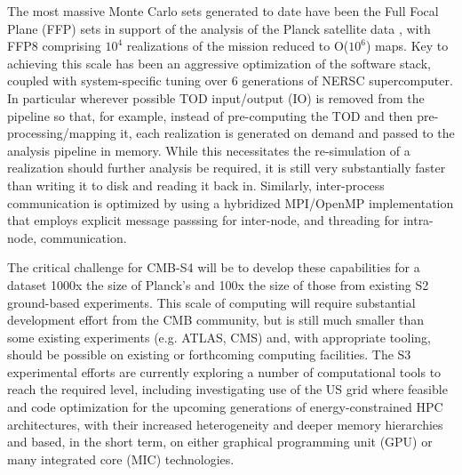 The most massive Monte Carlo sets generated to date have been the Full Focal Plane (FFP) sets in support of the analysis of the Planck satellite data \cite{Ade:2015via}, with FFP8 comprising $10^4$ realizations of the mission reduced to O($10^6$) maps. Key to achieving this scale has been an aggressive optimization of the software stack, coupled with system-specific tuning over 6 generations of NERSC supercomputer. In particular wherever possible TOD input/output (IO) is removed from the pipeline so that, for example, instead of pre-computing the TOD and then pre-processing/mapping it, each realization is generated on demand and passed to the analysis pipeline in memory. While this necessitates the re-simulation of a realization should further analysis be required, it is still very substantially faster than writing it to disk and reading it back in. Similarly, inter-process communication is optimized by using a hybridized MPI/OpenMP implementation that employs explicit message passsing for inter-node, and threading for intra-node, communication.

The critical challenge for CMB-S4 will be to develop these capabilities for a dataset 1000x the size of Planck's and 100x the size of those from existing S2 ground-based experiments. This scale of computing will require substantial development effort from the CMB community, but is still much smaller than some existing experiments (e.g. ATLAS, CMS) and, with appropriate tooling, should be possible on existing or forthcoming computing facilities. The S3 experimental efforts are currently exploring a number of computational tools to reach the required level, including investigating use of the US grid where feasible and code optimization for the upcoming generations of energy-constrained HPC architectures, with their increased heterogeneity and deeper memory hierarchies and based, in the short term, on either graphical programming unit (GPU) or many integrated core (MIC) technologies.

%



